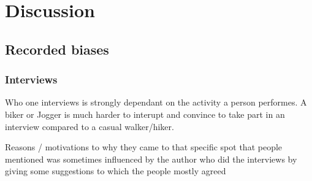 \chapter{Discussion} \label{discussion}

\section{Recorded biases}

\subsection{Interviews}
Who one interviews is strongly dependant on the activity a person performes. A biker or Jogger is much harder to interupt and convince to take part in an interview compared to a casual walker/hiker.

Reasons / motivations to why they came to that specific spot that people mentioned was sometimes influenced by the author who did the interviews by giving some suggestions to which the people mostly agreed 